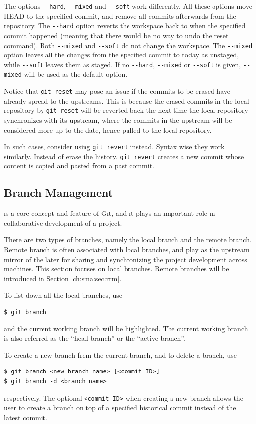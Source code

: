 The options \verb|--hard|, \verb|--mixed| and \verb|--soft| work differently. All these options move HEAD to the specified commit, and remove all commits afterwards from the repository. The \verb|--hard| option reverts the workspace back to when the specified commit happened (meaning that there would be no way to undo the reset command). Both \verb|--mixed| and \verb|--soft| do not change the workspace. The \verb|--mixed| option leaves all the changes from the specified commit to today as unstaged, while \verb|--soft| leaves them as staged. If no \verb|--hard|, \verb|--mixed| or \verb|--soft| is given, \verb|--mixed| will be used as the default option.

Notice that \verb|git reset| may pose an issue if the commits to be erased have already spread to the upstreams. This is because the erased commits in the local repository by \verb|git reset| will be reverted back the next time the local repository synchronizes with its upstream, where the commits in the upstream will be considered more up to the date, hence pulled to the local repository.

In such cases, consider using \verb|git revert| instead. Syntax wise they work similarly. Instead of erase the history, \verb|git revert| creates a new commit whose content is copied and pasted from a past commit.

\subsection{Branch Management}

 is a core concept and feature of Git, and it plays an important role in collaborative development of a project. 

There are two types of branches, namely the local branch and the remote branch. Remote branch is often associated with local branches, and play as the upstream mirror of the later for sharing and synchronizing the project development across machines. This section focuses on local branches. Remote branches will be introduced in Section \ref{ch:sma:sec:rrm}.

To list down all the local branches, use
\begin{lstlisting}
$ git branch
\end{lstlisting}
and the current working branch will be highlighted. The current working branch is also referred as the ``head branch'' or the ``active branch''.

To create a new branch from the current branch, and to delete a branch, use
\begin{lstlisting}
$ git branch <new branch name> [<commit ID>]
$ git branch -d <branch name>
\end{lstlisting}
respectively. The optional \verb|<commit ID>| when creating a new branch allows the user to create a branch on top of a specified historical commit instead of the latest commit.

